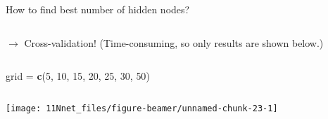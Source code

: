 \documentclass[10pt,ignorenonframetext,]{beamer}
\newenvironment{Shaded}{\begin{snugshade}}{\end{snugshade}}
\newcommand{\DecValTok}[1]{\textcolor[rgb]{0.00,0.00,0.81}{#1}}
\newcommand{\KeywordTok}[1]{\textcolor[rgb]{0.13,0.29,0.53}{\textbf{#1}}}
\newcommand{\NormalTok}[1]{#1}
\newcommand{\StringTok}[1]{\textcolor[rgb]{0.31,0.60,0.02}{#1}}
\begin{document}
\begin{frame}[fragile]

\begin{block}{How to find best number of hidden nodes?}

\(~\)

\(\rightarrow\) Cross-validation! (Time-consuming, so only results are
shown below.)

\(~\)

\scriptsize

\begin{Shaded}
\begin{Highlighting}[]
\NormalTok{grid =}\StringTok{ }\KeywordTok{c}\NormalTok{(}\DecValTok{5}\NormalTok{, }\DecValTok{10}\NormalTok{, }\DecValTok{15}\NormalTok{, }\DecValTok{20}\NormalTok{, }\DecValTok{25}\NormalTok{, }\DecValTok{30}\NormalTok{, }\DecValTok{50}\NormalTok{)}
\end{Highlighting}
\end{Shaded}

\(~\)

\center

\texttt{[image: 11Nnet\_files/figure-beamer/unnamed-chunk-23-1]}

\end{block}

\end{frame}
\end{document}

